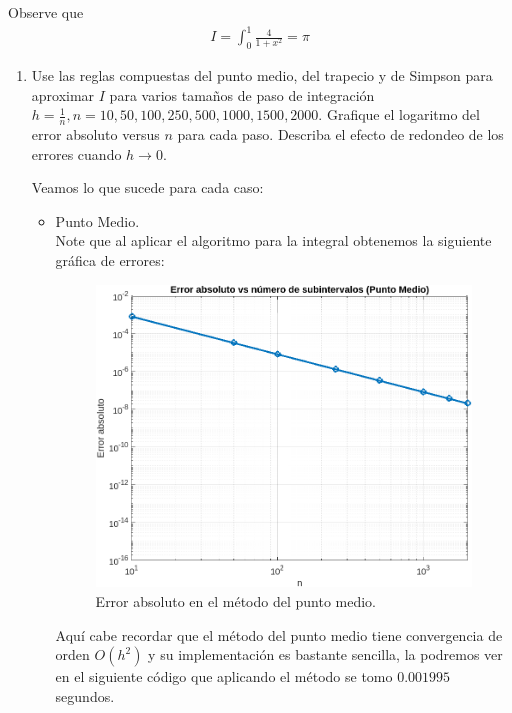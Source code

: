 \begin{homeworkProblem}
  Observe que
  \begin{align*}
    I=\int_{0}^{1}\frac{4}{1+x^2}=\pi 
  \end{align*}
  \begin{enumerate}
    \item Use las reglas compuestas del punto medio, del trapecio y de Simpson para aproximar $I$ para varios tamaños de paso de integración $h= \frac{1}{n}, n = 10,50, 100, 250, 500, 1000, 1500, 2000$. Grafique el logaritmo del error absoluto versus $n$ para cada paso. Describa el efecto de redondeo de los errores cuando $h\to 0$.
      \begin{solucion}
        Veamos lo que sucede para cada caso:
        \begin{itemize}
          \item Punto Medio.\\
            Note que al aplicar el algoritmo para la integral obtenemos la siguiente gráfica de errores:
            \begin{figure}[H]
            \begin{center}
              \includegraphics[scale=0.7]{Figures/puntomedio.png}
            \end{center}
            \caption{Error absoluto en el método del punto medio.}
            \end{figure}
            Aquí cabe recordar que el método del punto medio tiene convergencia de orden $O(h^2)$ y su implementación es bastante sencilla, la podremos ver en el siguiente código que aplicando el método se tomo $0.001995$ segundos.

\end{itemize}
\end{solucion}
\end{enumerate}
\end{homeworkProblem}
